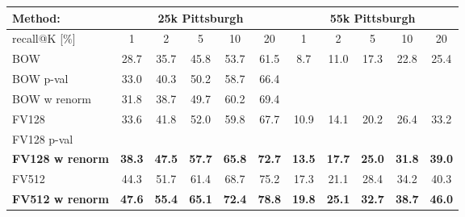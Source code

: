 \begin{table*}[t!]
\begin{centering}
	\begin{tabularx}{0.68\linewidth}{|l|c c c c c|c c c c c|}
		\hline 
		\rowcolor{maroon!50}
		Method: & \multicolumn{5}{c|}{25k Pittsburgh} & \multicolumn{5}{c|}{55k Pittsburgh} \\
		\hline 
		\hline 
		\rowcolor{maroon!50}
		recall@K [$\%$] & 1 & 2 & 5 & 10 & 20 & 1 & 2 & 5 & 10 & 20\\
		\hline
		\rowcolor{maroon!10}
		BOW & 28.7 & 35.7 & 45.8 & 53.7 & 61.5 & 8.7 & 11.0 & 17.3 & 22.8 & 25.4  \\
        \rowcolor{maroon!10}
		BOW p-val  & 33.0  & 40.3  & 50.2 &  58.7 &  66.4  & & & & & \\
        \rowcolor{maroon!10}
		BOW w renorm & 31.8 & 38.7 & 49.7 & 60.2 & 69.4  & & & & & \\
        \hline
		\rowcolor{maroon!10}
		FV128         & 33.6 & 41.8 & 52.0 & 59.8 & 67.7 & 10.9 & 14.1 & 20.2 & 26.4 & 33.2 \\
		\rowcolor{maroon!10}
		FV128 p-val   & \textbf{}  & \textbf{} & \textbf{} & \textbf{} & \textbf{}  &
                                 \textbf{}  &  \textbf{}  &  \textbf{}  &  \textbf{}  &  \textbf{} \\
        \rowcolor{maroon!10}
		\textbf{FV128 w renorm}   & \textbf{38.3}  & \textbf{47.5} & \textbf{57.7} & \textbf{65.8} & \textbf{72.7}  &
                                 \textbf{13.5}  &  \textbf{17.7}  &  \textbf{25.0}  &  \textbf{31.8}  &  \textbf{39.0} \\
        \hline  
    \rowcolor{maroon!10}
    FV512         & 44.3 & 51.7 & 61.4 & 68.7 & 75.2 & 17.3 &  21.1 &  28.4 &  34.2 &  40.3 \\
    \rowcolor{maroon!10}
    \rowcolor{maroon!10}
    \textbf{FV512 w renorm}   & \textbf{47.6}  & \textbf{55.4} & \textbf{65.1} & \textbf{72.4} & \textbf{78.8}  &
                             \textbf{19.8} &  \textbf{25.1} &  \textbf{32.7}  & \textbf{38.7} &  \textbf{46.0} \\

\end{tabularx}
\end{centering}
\end{table*}
